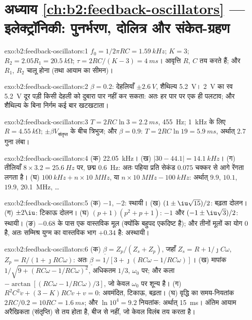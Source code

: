 \section*{अध्याय \ref{ch:b2:feedback-oscillators} --- इलेक्ट्रॉनिकी: पुनर्भरण, दोलित्र और संकेत-ग्रहण}

\begin{solution}{exo:b2:feedback-oscillators:1}
$f_0 = 1/2\pi RC = \qty{1.59}{kHz}$; $K = 3$; $R_2 = 2.05R_1 = \qty{20.5}{k\ohm}$;
$\tau = 2RC/(K - 3) = \qty{4}{ms}$। आवृत्ति $R$, $C$ तय करते हैं; और $R_1$, $R_2$
चालू होना (तथा आयाम का सीमन)।
\end{solution}

\begin{solution}{exo:b2:feedback-oscillators:2}
$\beta = 0.2$: देहलियाँ $\pm\qty{2.6}{V}$, शैथिल्य \qty{5.2}{V}। \qty{2}{V} का रव
\qty{5.2}{V} दूर पड़ी किसी देहली को दुबारा पार नहीं कर सकता: अतः हर पार पर एक ही
पलटाव; और शैथिल्य के बिना निर्गम कई बार खटखटाता।
\end{solution}

\begin{solution}{exo:b2:feedback-oscillators:3}
$T = 2RC\ln3 = \qty{2.2}{ms}$, \qty{455}{Hz}; \qty{1}{kHz} के लिए $R = \qty{4.55}{k\ohm}$;
$\pm\beta V_{\text{संतृप्त}}$ के बीच त्रिभुज; और $\beta = 0.9$: $T = 2RC\ln19 = \qty{5.9}{ms}$,
अर्थात् $2.7$ गुना लंबा।
\end{solution}

\begin{solution}{exo:b2:feedback-oscillators:4}
(क) \qty{22.05}{kHz}। (ख) $|30 - 44.1| = \qty{14.1}{kHz}$। (ग) तीलियाँ $8 \times 3.2 =
\qty{25.6}{Hz}$ पर, छद्म \qty{0.6}{Hz}: अतः पहिया प्रति सेकंड
$0.075$ चक्कर से आगे रेंगता लगता है। (घ) $\qty{100}{kHz} + n \times \qty{10}{MHz}$, या $n \times \qty{10}{MHz} -
\qty{100}{kHz}$: अर्थात् $9.9$, $10.1$, $19.9$, \qty{20.1}{MHz}, \dots
\end{solution}

\begin{solution}{exo:b2:feedback-oscillators:5}
(क) $-1$, $-2$: स्थायी। (ख) $(1 \pm \iu\sqrt{15})/2$: बढ़ता दोलन।
(ग) $\pm2\iu$: टिकाऊ दोलन। (घ) $(p + 1)(p^2 + p + 1)$: $-1$ और
$(-1 \pm \iu\sqrt3)/2$: स्थायी। (ङ) $-0.68$ के पास एक वास्तविक मूल (क्योंकि
बहुपद एकदिष्ट है); और तीनों मूलों का योग $0$ है, अतः
सम्मिश्र युग्म का वास्तविक भाग $+0.34$ है: अस्थायी।
\end{solution}

\begin{solution}{exo:b2:feedback-oscillators:6}
(क) $\underline\beta = Z_p/(Z_s + Z_p)$, जहाँ $Z_s = R + 1/\jmath C\omega$, $Z_p = R/(1 +
\jmath RC\omega)$: अतः $\underline\beta = 1/[3 + \jmath(RC\omega - 1/RC\omega)]$। (ख) मापांक
$1/\sqrt{9 + (RC\omega - 1/RC\omega)^2}$, अधिकतम $1/3$, $\omega_0$ पर; और कला $-\arctan
[(RC\omega - 1/RC\omega)/3]$, जो केवल $\omega_0$ पर शून्य है। (ग) $R^2C^2\ddot v + (3 - K)RC
\dot v + v = 0$: अवमंदित, टिकाऊ, बढ़ता। (घ) वृद्धि का समय-नियतांक
$2RC/0.2 = 10RC = \qty{1.6}{ms}$; और $\ln10^4 = 9.2$ नियतांक: अर्थात् \qty{15}{ms}।
अंतिम आयाम अरैखिकता (संतृप्ति) से तय होता है, बीज से नहीं,
जो केवल विलंब तय करता है।
\end{solution}

